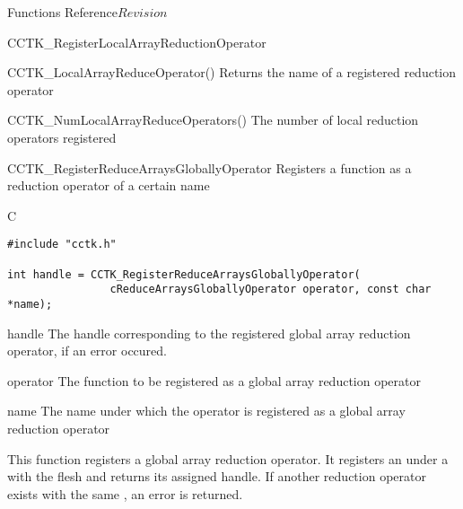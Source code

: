 \begin{cactuspart}{ Functions Reference}{}{$Revision$}
\begin{FunctionDescription}{CCTK\_RegisterLocalArrayReductionOperator}
\begin{SeeAlsoSection}
\begin{SeeAlso}{CCTK\_LocalArrayReduceOperator()}
Returns the name of a registered reduction operator
\end{SeeAlso}

\begin{SeeAlso}{CCTK\_NumLocalArrayReduceOperators()}
The number of local reduction operators registered
\end{SeeAlso}
\end{SeeAlsoSection}
\end{FunctionDescription}

\begin{FunctionDescription}{CCTK\_RegisterReduceArraysGloballyOperator}
\label{CCTK-RegisterReduceArraysGloballyOperator}
Registers a function as a reduction operator of a certain name

\begin{SynopsisSection}
\begin{Synopsis}{C}
\begin{verbatim}
#include "cctk.h"

int handle = CCTK_RegisterReduceArraysGloballyOperator(
                cReduceArraysGloballyOperator operator, const char *name);
\end{verbatim}
\end{Synopsis}
\end{SynopsisSection}

\begin{ResultSection}
\begin{Result}{handle}
The handle corresponding to the registered global array reduction operator, 
if an error occured.
\end{Result}
\end{ResultSection}

\begin{ParameterSection}
\begin{Parameter}{operator}
The function to be registered as a global array reduction operator
\end{Parameter}
\begin{Parameter}{name}
The name under which the operator is registered as a global array reduction operator
\end{Parameter}
\end{ParameterSection}

\begin{Discussion}
This function registers a global array reduction operator. It registers an 
under a  with the flesh and returns its assigned handle. If another reduction
operator exists with the same , an error is returned.
\end{Discussion}


\end{FunctionDescription}
\end{cactuspart}
